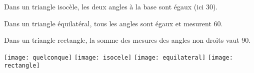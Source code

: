 {\begin{myexs}
\begin{multicols}{2}
			
			Dans un triangle isocèle, les deux angles à la base sont égaux (ici 30\degree).
			\vspace*{2.5cm}
			
			
			Dans un triangle équilatéral, tous les angles sont égaux et mesurent 60\degree.
			\vspace*{2.5cm}
			
			Dans un triangle rectangle, la somme des mesures des angles non droits vaut 90\degree.
			
			
			\begin{center}	
				\texttt{[image: quelconque]}	
				\texttt{[image: isocele]}	
				\texttt{[image: equilateral]}
				\texttt{[image: rectangle]}
			\end{center}
		\end{multicols}
	\end{myexs}
}

